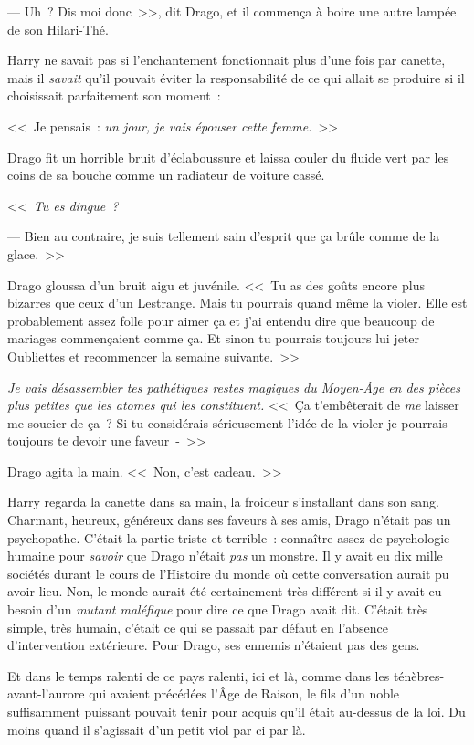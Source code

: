 --- Uh~? Dis moi donc~>>, dit Drago, et il commença à boire une autre lampée de son Hilari-Thé.

Harry ne savait pas si l'enchantement fonctionnait plus d'une fois par canette, mais il \emph{savait} qu'il pouvait éviter la responsabilité de ce qui allait se produire si il choisissait parfaitement son moment~:

<<~Je pensais~: \emph{un jour, je vais épouser cette femme.}~>>

Drago fit un horrible bruit d'éclaboussure et laissa couler du fluide vert par les coins de sa bouche comme un radiateur de voiture cassé.

<<~\emph{Tu es dingue~?}

--- Bien au contraire, je suis tellement sain d'esprit que ça brûle comme de la glace.~>>

Drago gloussa d'un bruit aigu et juvénile. <<~Tu as des goûts encore plus bizarres que ceux d'un Lestrange. Mais tu pourrais quand même la violer. Elle est probablement assez folle pour aimer ça et j'ai entendu dire que beaucoup de mariages commençaient comme ça. Et sinon tu pourrais toujours lui jeter Oubliettes et recommencer la semaine suivante.~>>

\emph{Je vais désassembler tes pathétiques restes magiques du Moyen-Âge en des pièces plus petites que les atomes qui les constituent.} <<~Ça t'embêterait de \emph{me} laisser me soucier de ça~? Si tu considérais sérieusement l'idée de la violer je pourrais toujours te devoir une faveur~-~>>

Drago agita la main. <<~Non, c'est cadeau.~>>

Harry regarda la canette dans sa main, la froideur s'installant dans son sang. Charmant, heureux, généreux dans ses faveurs à ses amis, Drago n'était pas un psychopathe. C'était la partie triste et terrible~: connaître assez de psychologie humaine pour \emph{savoir} que Drago n'était \emph{pas} un monstre. Il y avait eu dix mille sociétés durant le cours de l'Histoire du monde où cette conversation aurait pu avoir lieu. Non, le monde aurait été certainement très différent si il y avait eu besoin d'un \emph{mutant maléfique} pour dire ce que Drago avait dit. C'était très simple, très humain, c'était ce qui se passait par défaut en l'absence d'intervention extérieure. Pour Drago, ses ennemis n'étaient pas des gens.

Et dans le temps ralenti de ce pays ralenti, ici et là, comme dans les ténèbres-avant-l'aurore qui avaient précédées l'Âge de Raison, le fils d'un noble suffisamment puissant pouvait tenir pour acquis qu'il était au-dessus de la loi. Du moins quand il s'agissait d'un petit viol par ci par là.

